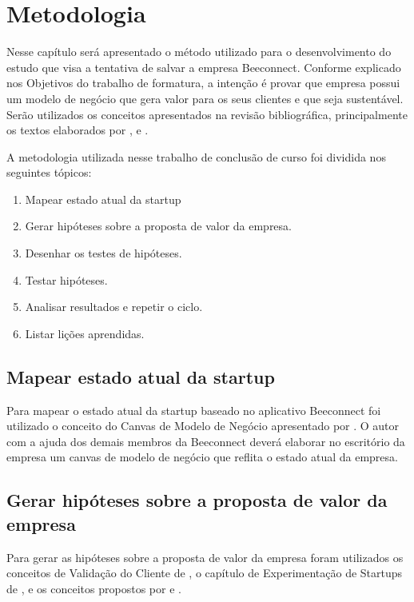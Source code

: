 \chapter[Metodologia]{Metodologia}
\label{chap:metodologia}
Nesse capítulo será apresentado o método utilizado para o desenvolvimento do estudo que visa a tentativa de salvar a empresa Beeconnect. Conforme explicado nos Objetivos do trabalho de formatura, a intenção é provar que empresa possui um modelo de negócio que gera valor para os seus clientes e que seja sustentável. Serão utilizados os conceitos apresentados na revisão bibliográfica, principalmente os textos elaborados por ,  e .

A metodologia utilizada nesse trabalho de conclusão de curso foi dividida nos seguintes tópicos:
\begin{enumerate}
\item Mapear estado atual da startup
\item Gerar hipóteses sobre a proposta de valor da empresa.
\item Desenhar os testes de hipóteses.
\item Testar hipóteses.
\item Analisar resultados e repetir o ciclo.
\item Listar lições aprendidas.
\end{enumerate}

\section{Mapear estado atual da startup}
\label{cha:mapear_estado}
Para mapear o estado atual da startup baseado no aplicativo Beeconnect foi utilizado o conceito do Canvas de Modelo de Negócio apresentado por .
O autor com a ajuda dos demais membros da Beeconnect deverá elaborar no escritório da empresa um canvas de modelo de negócio que reflita o estado atual da empresa. 

\section{Gerar hipóteses sobre a proposta de valor da empresa}
\label{cha:gerar_hipoteses}
Para gerar as hipóteses sobre a proposta de valor da empresa foram utilizados os conceitos de Validação do Cliente de , o capítulo de Experimentação de Startups de , e os conceitos propostos por  e .    

